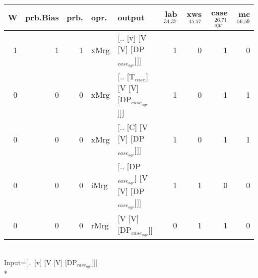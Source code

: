 \begin{tabularx}{\linewidth}{rrrlXrrrr}
\hline
   W &   prb.Bias &   prb. & opr.   & output                                   &   lab$^{34.37}$ &   xws$^{45.57}$ &   case$_{agr}^{26.71}$ &   mc$^{56.59}$ \\
\hline
   1 &       1 &   1 & xMrg & [.. [v] [V [V] [DP$_{case_{agr}}$]]]           &             1 &             0 &                  1 &            0 \\
   0 &       0 &   0 & xMrg & [.. [T$_{case}$] [V [V] [DP$_{case_{agr}}$]]]      &             1 &             0 &                  1 &            1 \\
   0 &       0 &   0 & xMrg & [.. [C] [V [V] [DP$_{case_{agr}}$]]]           &             1 &             0 &                  1 &            1 \\
   0 &       0 &   0 & iMrg & [.. [DP$_{case_{agr}}$] [V [V] [DP$_{case_{agr}}$]]] &             1 &             1 &                  0 &            0 \\
   0 &       0 &   0 & rMrg & [V [V] [DP$_{case_{agr}}$]]                    &             0 &             1 &                  1 &            0 \\
\hline
\end{tabularx}\endgroup\\
\begingroup\scriptsize Input=[.. [v] [V [V] [DP$_{case_{agr}}$]]]\\*
